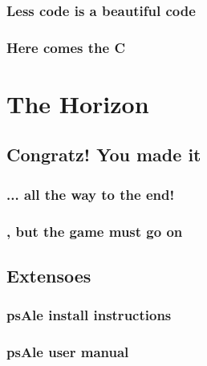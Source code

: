 \documentclass[12pt, a4paper]{book}
\begin{document}
\section{Less code is a beautiful code}
\section{Here comes the C}

\part[The Horizon]{The Horizon\\[2ex]
}

\chapter{Congratz! You made it}
\section{... all the way to the end!}
\section{, but the game must go on}
\chapter{Extensoes}
\section{psAle install instructions}
\section{psAle user manual}
\end{document}
